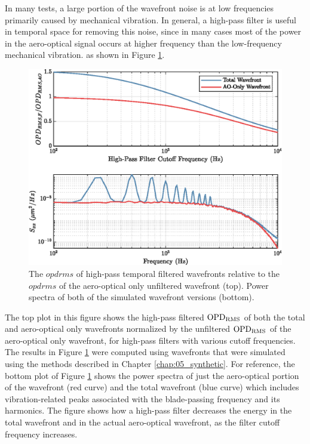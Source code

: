 In many tests, a large portion of the wavefront noise is at low frequencies primarily caused by mechanical vibration.
In general, a high-pass filter is useful in temporal space for removing this noise, since in many cases most of the power in the aero-optical signal occurs at higher frequency than the low-frequency mechanical vibration. as shown in Figure \ref{fig:06_filter_temporal}.
\begin{figure}
 \centering
 \includegraphics{../matlab/06_single_sensor_filtering/filter_temporal.eps}
 \caption{The $opdrms$ of high-pass temporal filtered wavefronts relative to the $opdrms$ of the aero-optical only unfiltered wavefront (top). Power spectra of both of the simulated wavefront versions (bottom).}
 \label{fig:06_filter_temporal}
\end{figure}
The top plot in this figure shows the high-pass filtered $\operatorname{OPD_{RMS}}$ of both the total and aero-optical only wavefronts normalized by the unfiltered $\operatorname{OPD_{RMS}}$ of the aero-optical only wavefront, for high-pass filters with various cutoff frequencies.
The results in Figure \ref{fig:06_filter_temporal} were computed using wavefronts that were simulated using the methods described in Chapter \ref{chap:05_synthetic}.
For reference, the bottom plot of Figure \ref{fig:06_filter_temporal} shows the power spectra of just the aero-optical portion of the wavefront (red curve) and the total wavefront (blue curve) which includes vibration-related peaks associated with the blade-passing frequency and its harmonics.
The figure shows how a high-pass filter decreases the energy in the total wavefront and in the actual aero-optical wavefront, as the filter cutoff frequency increases.
